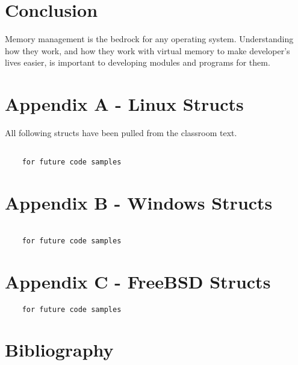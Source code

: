 \documentclass[10pt,letterpaper,onecolumn,draftclsnofoot]{IEEEtran}
\begin{document}
  \section{Conclusion}
	Memory management is the bedrock for any operating system. Understanding
	how they work, and how they work with virtual memory to make developer's
	lives easier, is important to developing modules and programs for them.

  \clearpage
  \section{Appendix A - Linux Structs}
  All following structs have been pulled from the classroom text. \cite{robertlove2010}
  \begin{lstlisting}

    for future code samples

  \end{lstlisting}

  \section{Appendix B - Windows Structs}
  \begin{lstlisting}

    for future code samples
  \end{lstlisting}
  \section{Appendix C - FreeBSD Structs}
  \begin{lstlisting}
    for future code samples

  \end{lstlisting}

  \section{Bibliography}
  
  
\end{document}
